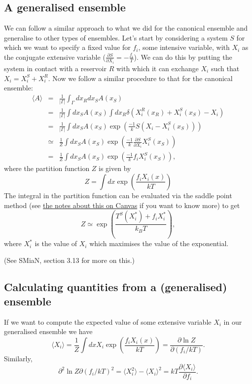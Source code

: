 \subsection{A generalised ensemble}

We can follow a similar approach to what we did for the canonical ensemble and generalise to other types of ensembles. Let's start by considering a system $S$ for which we want to specify a fixed value for $f_i$, some intensive variable, with $X_i$ as the conjugate extensive variable ($\frac{\partial S}{\partial X_i}=-\frac{f_i}{T}$). We can do this by putting the system in contact with a reservoir $R$ with which it can exchange $X_i$ such that $X_i = X_i^S+X_i^R$. Now we follow a similar procedure to that for the canonical ensemble:
\begin{eqnarray*}
	\langle A \rangle &=& \frac{1}{|\Gamma|}\int_{\Gamma}dx_R dx_S A(x_S)\\
	&=& \frac{1}{|\Gamma|}\int dx_S A(x_S)\int dx_R \delta(X_i^R(x_R)+X_i^S(x_S)-X_i)\\
	&=& \frac{1}{|\Gamma|}\int dx_S A(x_S)\exp\left( \frac{-1}{k}S(X_i-X_i^S(x_S))\right)\\
	&\simeq& \frac{1}{Z}\int dx_S A(x_S)\exp\left( \frac{-1}{k}\frac{\partial S}{\partial X_i}X_i^S(x_S)\right)\\
	&=& \frac{1}{Z}\int dx_S A(x_S)\exp\left( \frac{-1}{k} f_i X_i^S(x_S)\right),
\end{eqnarray*}
where the partition function $Z$ is given by
\begin{equation}
	Z= \int dx \exp\left( \frac{f_iX_i(x)}{kT} \right)
\end{equation}
The integral in the partition function can be evaluated via the saddle point method (see \href{https://canvas.auckland.ac.nz/courses/40625/files/2902102?module_item_id=604184}{the notes about this on Canvas} if you want to know more) to get
\begin{equation*}
	Z \simeq \exp\left(\frac{T^S(X_i^*)+f_iX_i^*}{k_BT}\right),
\end{equation*}
where $X_i^*$ is the value of $X_i$ which maximises the value of the exponential.

(See SMiaN, section 3.13 for more on this.)

\subsection{Calculating quantities from a (generalised) ensemble}

If we want to compute the expected value of some extensive variable $X_i$ in our generalised ensemble we have
\[
	\langle X_i\rangle = \frac{1}{Z}\int dx X_i \exp\left(\frac{f_iX_i(x)}{kT}\right) = \frac{\partial \ln Z}{\partial (f_i/kT)}.
\]
Similarly,
\[
	{\partial^2 \ln Z}{\partial (f_i/kT)^2} = \langle X_i^2 \rangle - \langle X_i \rangle^2 = kT\frac{\partial \langle X_i\rangle}{\partial f_i}.
\]

